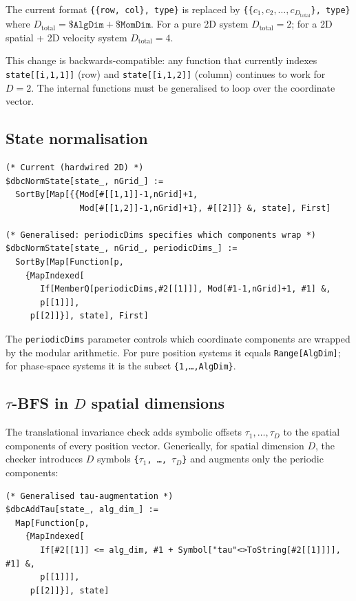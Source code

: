 \documentclass[12pt,a4paper]{article}
\begin{document}
The current format \texttt{\{\{row, col\}, type\}} is replaced by
\texttt{\{\{$c_1, c_2, \ldots, c_{D_\text{total}}$\}, type\}} where
$D_\text{total} = \texttt{\$AlgDim} + \texttt{\$MomDim}$.  For a pure 2D
system $D_\text{total} = 2$; for a 2D spatial + 2D velocity system
$D_\text{total} = 4$.

This change is backwards-compatible: any function that currently indexes
\texttt{state[[i,1,1]]} (row) and \texttt{state[[i,1,2]]} (column) continues
to work for $D = 2$.  The internal functions must be generalised to loop over
the coordinate vector.

\subsection{State normalisation}

\begin{lstlisting}
(* Current (hardwired 2D) *)
$dbcNormState[state_, nGrid_] :=
  SortBy[Map[{{Mod[#[[1,1]]-1,nGrid]+1,
               Mod[#[[1,2]]-1,nGrid]+1}, #[[2]]} &, state], First]

(* Generalised: periodicDims specifies which components wrap *)
$dbcNormState[state_, nGrid_, periodicDims_] :=
  SortBy[Map[Function[p,
    {MapIndexed[
       If[MemberQ[periodicDims,#2[[1]]], Mod[#1-1,nGrid]+1, #1] &,
       p[[1]]],
     p[[2]]}], state], First]
\end{lstlisting}

The \texttt{periodicDims} parameter controls which coordinate components are
wrapped by the modular arithmetic.  For pure position systems it equals
\texttt{Range[AlgDim]}; for phase-space systems it is the subset
\texttt{\{1,\ldots,AlgDim\}}.

\subsection{\texorpdfstring{$\tau$}{Tau}-BFS in \texorpdfstring{$D$}{D} spatial dimensions}

The translational invariance check adds symbolic offsets $\tau_1, \ldots,
\tau_D$ to the spatial components of every position vector.  Generically, for
spatial dimension $D$, the checker introduces $D$ symbols \texttt{\{$\tau_1$,
\ldots, $\tau_D$\}} and augments only the periodic components:

\begin{lstlisting}
(* Generalised tau-augmentation *)
$dbcAddTau[state_, alg_dim_] :=
  Map[Function[p,
    {MapIndexed[
       If[#2[[1]] <= alg_dim, #1 + Symbol["tau"<>ToString[#2[[1]]]], #1] &,
       p[[1]]],
     p[[2]]}], state]
\end{lstlisting}
\end{document}
